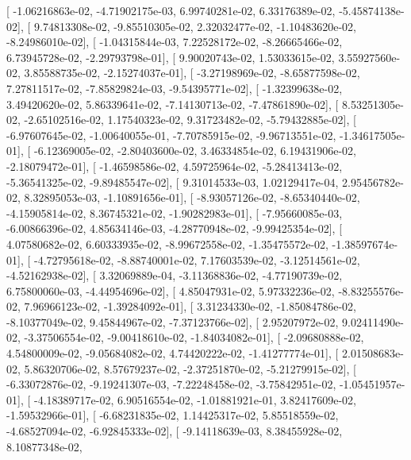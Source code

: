 \documentclass{article}
\begin{document}
       [ -1.06216863e-02,  -4.71902175e-03,   6.99740281e-02,
          6.33176389e-02,  -5.45874138e-02],
       [  9.74813308e-02,  -9.85510305e-02,   2.32032477e-02,
         -1.10483620e-02,  -8.24986010e-02],
       [ -1.04315844e-03,   7.22528172e-02,  -8.26665466e-02,
          6.73945728e-02,  -2.29793798e-01],
       [  9.90020743e-02,   1.53033615e-02,   3.55927560e-02,
          3.85588735e-02,  -2.15274037e-01],
       [ -3.27198969e-02,  -8.65877598e-02,   7.27811517e-02,
         -7.85829824e-03,  -9.54395771e-02],
       [ -1.32399638e-02,   3.49420620e-02,   5.86339641e-02,
         -7.14130713e-02,  -7.47861890e-02],
       [  8.53251305e-02,  -2.65102516e-02,   1.17540323e-02,
          9.31723482e-02,  -5.79432885e-02],
       [ -6.97607645e-02,  -1.00640055e-01,  -7.70785915e-02,
         -9.96713551e-02,  -1.34617505e-01],
       [ -6.12369005e-02,  -2.80403600e-02,   3.46334854e-02,
          6.19431906e-02,  -2.18079472e-01],
       [ -1.46598586e-02,   4.59725964e-02,  -5.28413413e-02,
         -5.36541325e-02,  -9.89485547e-02],
       [  9.31014533e-03,   1.02129417e-04,   2.95456782e-02,
          8.32895053e-03,  -1.10891656e-01],
       [ -8.93057126e-02,  -8.65340440e-02,  -4.15905814e-02,
          8.36745321e-02,  -1.90282983e-01],
       [ -7.95660085e-03,  -6.00866396e-02,   4.85634146e-03,
         -4.28770948e-02,  -9.99425354e-02],
       [  4.07580682e-02,   6.60333935e-02,  -8.99672558e-02,
         -1.35475572e-02,  -1.38597674e-01],
       [ -4.72795618e-02,  -8.88740001e-02,   7.17603539e-02,
         -3.12514561e-02,  -4.52162938e-02],
       [  3.32069889e-04,  -3.11368836e-02,  -4.77190739e-02,
          6.75800060e-03,  -4.44954696e-02],
       [  4.85047931e-02,   5.97332236e-02,  -8.83255576e-02,
          7.96966123e-02,  -1.39284092e-01],
       [  3.31234330e-02,  -1.85084786e-02,  -8.10377049e-02,
          9.45844967e-02,  -7.37123766e-02],
       [  2.95207972e-02,   9.02411490e-02,  -3.37506554e-02,
         -9.00418610e-02,  -1.84034082e-01],
       [ -2.09680888e-02,   4.54800009e-02,  -9.05684082e-02,
          4.74420222e-02,  -1.41277774e-01],
       [  2.01508683e-02,   5.86320706e-02,   8.57679237e-02,
         -2.37251870e-02,  -5.21279915e-02],
       [ -6.33072876e-02,  -9.19241307e-03,  -7.22248458e-02,
         -3.75842951e-02,  -1.05451957e-01],
       [ -4.18389717e-02,   6.90516554e-02,  -1.01881921e-01,
          3.82417609e-02,  -1.59532966e-01],
       [ -6.68231835e-02,   1.14425317e-02,   5.85518559e-02,
         -4.68527094e-02,  -6.92845333e-02],
       [ -9.14118639e-03,   8.38455928e-02,   8.10877348e-02,
\end{document}
